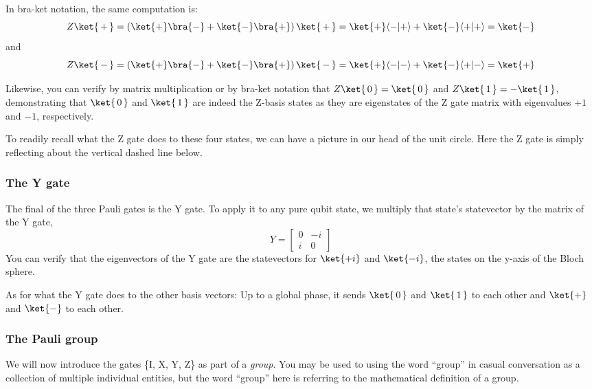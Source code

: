 \documentclass{article}
\theoremstyle{definition}
\newcommand{\kz}[1]{\ket{\,#1\,}}
\newcommand{\kx}[1]{\ket{#1}}
\newcommand{\bx}[1]{\bra{#1}}
\begin{document}
In bra-ket notation, the same computation is:
\begin{equation}
	Z \kz+ = \left(\kx+ \bx- + \kx- \bx+\right) \kz+ = \kx+ \langle -|+ \rangle + \kx- \langle +|+ \rangle = \kx-
\end{equation}
and
\begin{equation}
	Z \kz- = \left(\kx+ \bx- + \kx- \bx+\right) \kz- = \kx+ \langle -|- \rangle + \kx- \langle +|- \rangle = \kx+
\end{equation}

Likewise, you can verify by matrix multiplication or by bra-ket notation that $Z \kz0 = \kz0$ and $Z \kz1 = -\kz1$, demonstrating that $\kz0$ and $\kz1$ are indeed the Z-basis states as they are eigenstates of the Z gate matrix with eigenvalues $+1$ and $-1$, respectively.

To readily recall what the Z gate does to these four states, we can have a picture in our head of the unit circle.
Here the Z gate is simply reflecting about the vertical dashed line below.
\begin{figure}[H]
\end{figure}
\begin{figure}[H]
\end{figure}

\subsubsection{The Y gate}
The final of the three Pauli gates is the Y gate.
To apply it to any pure qubit state, we multiply that state's statevector by the matrix of the Y gate,
\begin{equation}
	Y = \begin{bmatrix}
		0 & -i\\
		i & 0
	\end{bmatrix}
\end{equation}
You can verify that the eigenvectors of the Y gate are the statevectors for $\ket{+i}$ and $\ket{-i}$, the states on the y-axis of the Bloch sphere.

As for what the Y gate does to the other basis vectors: Up to a global phase, it sends $\kz0$ and $\kz1$ to each other and $\kx+$ and $\kx-$ to each other.

\subsubsection{The Pauli group}
We will now introduce the gates \{I, X, Y, Z\} as part of a \textit{group}.
You may be used to using the word ``group'' in casual conversation as a collection of multiple individual entities, but the word ``group'' here is referring to the mathematical definition of a group.
\end{document}
